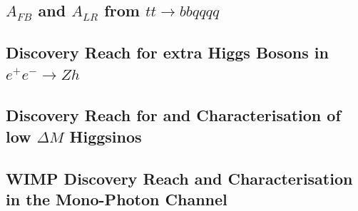 \subsection{$A_{FB}$ and $A_{LR}$ from $tt \to bb qqqq$}
\subsection{Discovery Reach for extra Higgs Bosons in $e^+e^- \to Zh$}
\subsection{Discovery Reach for and Characterisation of low $\Delta M$ Higgsinos}
\subsection{WIMP Discovery Reach and Characterisation in the Mono-Photon Channel}

